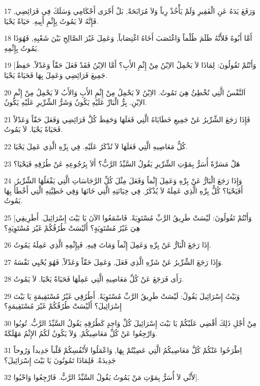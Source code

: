\par 17 وَرَفَعَ يَدَهُ عَنِ الْفَقِيرِ وَلَمْ يَأْخُذْ رِباً وَلاَ مُرَابَحَةً, بَلْ أَجْرَى أَحْكَامِي وَسَلَكَ فِي فَرَائِضِي, فَإِنَّهُ لاَ يَمُوتُ بِإِثْمِ أَبِيهِ. حَيَاةً يَحْيَا.
\par 18 أَمَّا أَبُوهُ فَلأَنَّهُ ظَلَمَ ظُلْماً وَاغْتَصَبَ أَخَاهُ اغْتِصَاباً, وَعَمِلَ غَيْرَ الصَّالِحِ بَيْنَ شَعْبِهِ, فَهُوَذَا يَمُوتُ بِإِثْمِهِ.
\par 19 [وَأَنْتُمْ تَقُولُونَ: لِمَاذَا لاَ يَحْمِلُ الاِبْنُ مِنْ إِثْمِ الأَبِ؟ أَمَّا الاِبْنُ فَقَدْ فَعَلَ حَقّاً وَعَدْلاً. حَفِظَ جَمِيعَ فَرَائِضِي وَعَمِلَ بِهَا فَحَيَاةً يَحْيَا.
\par 20 اَلنَّفْسُ الَّتِي تُخْطِئُ هِيَ تَمُوتُ. الاِبْنُ لاَ يَحْمِلُ مِنْ إِثْمِ الأَبِ وَالأَبُ لاَ يَحْمِلُ مِنْ إِثْمِ الاِبْنِ. بِرُّ الْبَارِّ عَلَيْهِ يَكُونُ وَشَرُّ الشِّرِّيرِ عَلَيْهِ يَكُونُ.
\par 21 فَإِذَا رَجَعَ الشِّرِّيرُ عَنْ جَمِيعِ خَطَايَاهُ الَّتِي فَعَلَهَا وَحَفِظَ كُلَّ فَرَائِضِي وَفَعَلَ حَقّاً وَعَدْلاً فَحَيَاةً يَحْيَا. لاَ يَمُوتُ.
\par 22 كُلُّ مَعَاصِيهِ الَّتِي فَعَلَهَا لاَ تُذْكَرُ عَلَيْهِ. فِي بِرِّهِ الَّذِي عَمِلَ يَحْيَا.
\par 23 هَلْ مَسَرَّةً أُسَرُّ بِمَوْتِ الشِّرِّيرِ يَقُولُ السَّيِّدُ الرَّبُّ؟ أَلاَ بِرُجُوعِهِ عَنْ طُرُقِهِ فَيَحْيَا؟
\par 24 وَإِذَا رَجَعَ الْبَارُّ عَنْ بِرِّهِ وَعَمِلَ إِثْماً وَفَعَلَ مِثْلَ كُلِّ الرَّجَاسَاتِ الَّتِي يَفْعَلُهَا الشِّرِّيرُ, أَفَيَحْيَا؟ كُلُّ بِرِّهِ الَّذِي عَمِلَهُ لاَ يُذْكَرُ. فِي خِيَانَتِهِ الَّتِي خَانَهَا وَفِي خَطِيَّتِهِ الَّتِي أَخْطَأَ بِهَا يَمُوتُ.
\par 25 [وَأَنْتُمْ تَقُولُونَ: لَيْسَتْ طَرِيقُ الرَّبِّ مُسْتَوِيَةً. فَاسْمَعُوا الآنَ يَا بَيْتَ إِسْرَائِيلَ. أَطَرِيقِي هِيَ غَيْرُ مُسْتَوِيَةٍ؟ أَلَيْسَتْ طُرُقُكُمْ غَيْرَ مُسْتَوِيَةٍ؟
\par 26 إِذَا رَجَعَ الْبَارُّ عَنْ بِرِّهِ وَعَمِلَ إِثْماً وَمَاتَ فِيهِ, فَبِإِثْمِهِ الَّذِي عَمِلَهُ يَمُوتُ.
\par 27 وَإِذَا رَجَعَ الشِّرِّيرُ عَنْ شَرِّهِ الَّذِي فَعَلَ, وَعَمِلَ حَقّاً وَعَدْلاً, فَهُوَ يُحْيِي نَفْسَهُ.
\par 28 رَأَى فَرَجَعَ عَنْ كُلِّ مَعَاصِيهِ الَّتِي عَمِلَهَا فَحَيَاةً يَحْيَا. لاَ يَمُوتُ.
\par 29 وَبَيْتُ إِسْرَائِيلَ يَقُولُ: لَيْسَتْ طَرِيقُ الرَّبِّ مُسْتَوِيَةً. أَطُرُقِي غَيْرُ مُسْتَقِيمَةٍ يَا بَيْتَ إِسْرَائِيلَ؟ أَلَيْسَتْ طُرُقُكُمْ غَيْرَ مُسْتَقِيمَةٍ؟
\par 30 مِنْ أَجْلِ ذَلِكَ أَقْضِي عَلَيْكُمْ يَا بَيْتَ إِسْرَائِيلَ كُلِّ وَاحِدٍ كَطُرُقِهِ يَقُولُ السَّيِّدُ الرَّبُّ. تُوبُوا وَارْجِعُوا عَنْ كُلِّ مَعَاصِيكُمْ, وَلاَ يَكُونُ لَكُمُ الإِثْمُ مَهْلَكَةً.
\par 31 اِطْرَحُوا عَنْكُمْ كُلَّ مَعَاصِيكُمُ الَّتِي عَصِيْتُمْ بِهَا, وَاعْمَلُوا لأَنْفُسِكُمْ قَلْباً جَدِيداً وَرُوحاً جَدِيدَةً. فَلِمَاذَا تَمُوتُونَ يَا بَيْتَ إِسْرَائِيلَ؟
\par 32 لأَنِّي لاَ أُسَرُّ بِمَوْتِ مَنْ يَمُوتُ يَقُولُ السَّيِّدُ الرَّبُّ. فَارْجِعُوا وَاحْيُوا].

